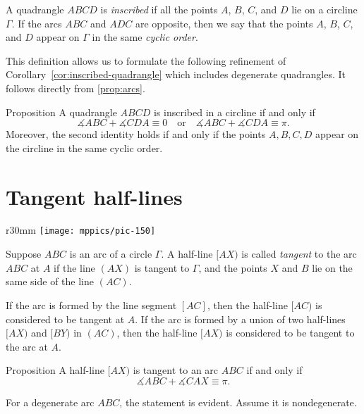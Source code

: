 A quadrangle $ABCD$ is 
\emph{inscribed}
if all the points $A$, $B$, $C$, and $D$ lie on a circline $\Gamma$.
If the arcs $ABC$ and $ADC$ are opposite, then we say that the points $A$, $B$, $C$, and $D$ appear on $\Gamma$ in the same \emph{cyclic order}.

This definition allows us to formulate the following refinement of Corollary~\ref{cor:inscribed-quadrangle} which includes degenerate quadrangles.
It follows directly from \ref{prop:arcs}.

\begin{thm}{Proposition}\label{prop:inscribed-quadrangle}
A quadrangle $ABCD$ is inscribed in a circline if and only if 
\[\measuredangle ABC+\measuredangle CDA\equiv 0
\quad\text{or}\quad
\measuredangle ABC+\measuredangle CDA\equiv\pi.\]
Moreover, the second identity holds if and only if the points $A,B,C,D$ appear on the circline in the same cyclic order.
\end{thm}

\section{Tangent half-lines}

\begin{wrapfigure}[6]{r}{30mm}
\vskip-10mm
\centering
\texttt{[image: mppics/pic-150]}
\end{wrapfigure}

Suppose $ABC$ is an arc of a circle $\Gamma$.
A half-line $[AX)$ is called 
\emph{tangent} 
to the arc $ABC$ at $A$
if the line $(AX)$ is tangent to $\Gamma$, and the points $X$ and $B$ lie on the same side of the line $(AC)$.

If the arc is formed by the line segment $[AC]$, then the half-line $[AC)$ is considered to be tangent at $A$.
If the arc is formed by a union of two half-lines $[AX)$ and $[BY)$ in $(AC)$,
then the half-line $[AX)$ is considered to be tangent to the arc at $A$.

\begin{thm}{Proposition}\label{prop:arc(angle=tan)}
A half-line $[AX)$ is tangent to an arc $ABC$ if and only if 
$$\measuredangle ABC+\measuredangle CAX\equiv \pi.$$

\end{thm}

For a degenerate arc $ABC$, 
the statement is evident.
Assume it is nondegenerate.

